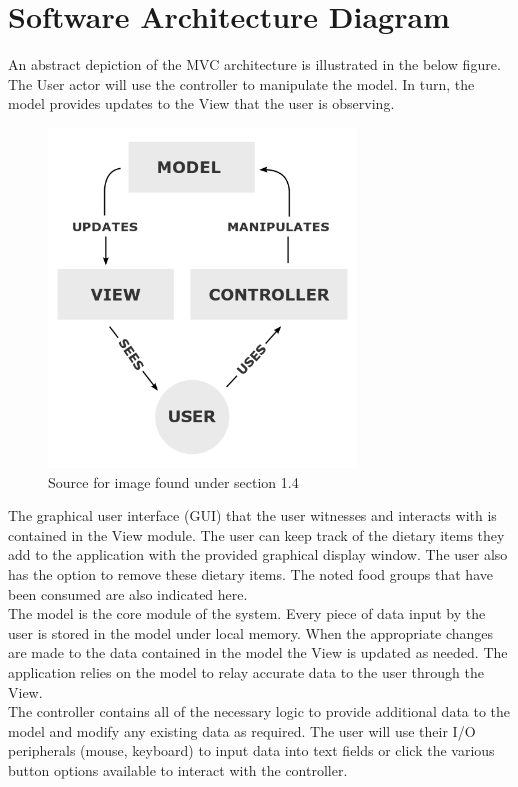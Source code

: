 \documentclass{scrreprt}
\begin{document}
\section{Software Architecture Diagram}

An abstract depiction of the MVC architecture is illustrated in the below figure. The User actor will use the controller to manipulate the model. In turn, the model provides updates to the View that the user is observing.

\begin{figure}[ht]
\centering
\includegraphics[height=9cm]{pictures/MVC-Process.png}
\caption{Source for image found under section 1.4}
\end{figure}

The graphical user interface (GUI) that the user witnesses and interacts with is contained in the View module. The user can keep track of the dietary items they add to the application with the provided graphical display window. The user also has the option to remove these dietary items. The noted food groups that have been consumed are also indicated here. \\

The model is the core module of the system. Every piece of data input by the user is stored in the model under local memory. When the appropriate changes are made to the data contained in the model the View is updated as needed. The application relies on the model to relay accurate data to the user through the View. \\

The controller contains all of the necessary logic to provide additional data to the model and modify any existing data as required. The user will use their I/O peripherals (mouse, keyboard) to input data into text fields or click the various button options available to interact with the controller.
\end{document}
